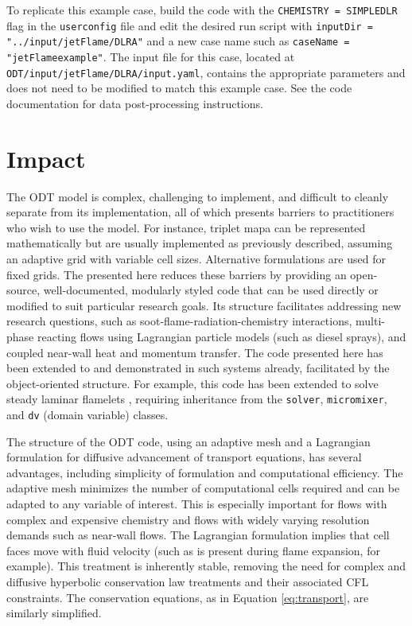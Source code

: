 \documentclass[preprint,12pt, a4paper]{elsarticle}
\begin{document}
To replicate this example case, build the code with the \texttt{CHEMISTRY = SIMPLEDLR} flag in the \texttt{user\textunderscore config} file and edit the desired run script with \texttt{inputDir = "../input/jetFlame/DLR\textunderscore A"} and a new case name such as \texttt{caseName = "jetFlame\textunderscore example"}. The input file for this case, located at \texttt{ODT/input/jetFlame/DLR\textunderscore A/input.yaml}, contains the appropriate parameters and does not need to be modified to match this example case. See the code documentation for data post-processing instructions.

\section{Impact}
\label{sec:impact}
The ODT model is complex, challenging to implement, and difficult to cleanly separate from its implementation, all of which presents barriers to practitioners who wish to use the model. For instance, triplet mapa can be represented mathematically but are usually implemented as previously described, assuming an adaptive grid with variable cell sizes. Alternative formulations are used for fixed grids. The   presented here reduces these barriers by providing an open-source, well-documented, modularly styled code that can be used directly or modified to suit particular research goals. Its structure facilitates addressing new research questions, such as soot-flame-radiation-chemistry interactions, multi-phase reacting flows using Lagrangian particle models (such as diesel sprays), and coupled near-wall heat and momentum transfer. The code presented here has been extended to and demonstrated in such systems already, facilitated by the object-oriented structure. For example, this code has been extended to solve steady laminar flamelets \cite{Peters_1984}, requiring inheritance from the \texttt{solver}, \texttt{micromixer}, and \texttt{dv} (domain variable) classes.

The structure of the ODT code, using an adaptive mesh and a Lagrangian formulation for diffusive advancement of transport equations, has several advantages, including simplicity of formulation and computational efficiency. The adaptive mesh minimizes the number of computational cells required and can be adapted to any variable of interest. This is especially important for flows with complex and expensive chemistry and flows with widely varying resolution demands such as near-wall flows. The Lagrangian formulation implies that cell faces move with fluid velocity (such as is present during flame expansion, for example). This treatment is inherently stable, removing the need for complex and diffusive hyperbolic conservation law treatments and their associated CFL constraints. The conservation equations, as in Equation \ref{eq:transport}, are similarly simplified.
\end{document}
